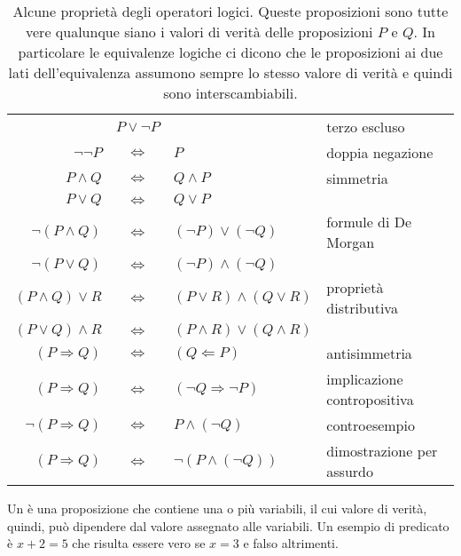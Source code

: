 \begin{table}
\begin{tabular}{rcll}
                         &$P \lor \neg P$&                                       &terzo escluso \\
                         $\neg \neg P$ & $\iff$ & $ P$                           & doppia negazione\\
                                    $P \land Q$ & $\iff$ & $ Q \land P$                   & simmetria\\
                                     $P \lor Q$ & $\iff$ & $ Q \lor P$                    & \\
                              $\neg (P\land Q)$ & $\iff$ & $ (\neg P) \lor (\neg Q)$      & formule di De Morgan\\
                               $\neg (P\lor Q)$ & $\iff$ & $ (\neg P) \land (\neg Q)$     & \\
                            $(P\land Q) \lor R$ & $\iff$ & $ (P\lor R) \land (Q \lor R)$  & proprietà distributiva\\
                            $(P\lor Q) \land R$ & $\iff$ & $ (P\land R) \lor (Q \land R)$ & \\
                            $(P \Rightarrow Q)$ & $\iff$ & $ (Q \Leftarrow P)$            & antisimmetria\\
                            $(P\Rightarrow Q)$ & $\iff$ & $ (\neg Q\Rightarrow\neg P)$   & implicazione contropositiva\\
                        $\neg (P\Rightarrow Q)$ & $\iff$ & $ P \land (\neg Q)$            & controesempio\\
                             $(P\Rightarrow Q)$ & $\iff$ & $ \lnot(P \land (\neg Q))$     & dimostrazione per assurdo
\end{tabular}
\caption{Alcune proprietà degli operatori logici.
Queste proposizioni sono tutte vere qualunque siano 
i valori di verità delle proposizioni $P$ e $Q$.
In particolare le equivalenze logiche ci dicono che 
le proposizioni ai due lati dell'equivalenza assumono 
sempre lo stesso valore di verità e quindi sono interscambiabili.}
\label{tab:operatori_logici}
\end{table}

Un  è una proposizione che contiene
una o più variabili, il cui valore di verità, quindi,
può dipendere dal valore assegnato alle variabili.
Un esempio di predicato è $x+2=5$ che risulta essere vero se $x=3$
e falso altrimenti.

